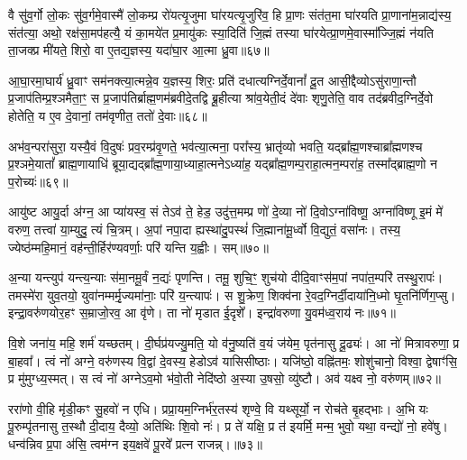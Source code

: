 वै सु॑व॒र्गो लो॒कः सु॑व॒र्गमे॒वास्मै॑ लो॒कम्प्र रो॑यत्यृ॒जुमा घा॑रयत्यृ॒जुरि॑व॒ हि प्रा॒णः संत॑त॒मा घा॑रयति प्रा॒णाना॑म॒न्नाद्य॑स्य॒ संत॑त्या॒ अथो॒ रक्ष॑सा॒मप॑हत्यै॒ यं का॒मये॑त प्र॒मायु॑कः स्या॒दिति॑ जि॒ह्मं तस्या घा॑रयेत्प्रा॒णमे॒वास्मा᳚ज्जि॒ह्मं न॑यति ता॒जक्प्र मी॑यते॒ शिरो॒ वा ए॒तद्य॒ज्ञस्य॒ यदा॑घा॒र आ॒त्मा ध्रु॒वा॥६७॥

आ॒घा॒रमा॒घार्य॑ ध्रु॒वाꣳ सम॑नक्त्या॒त्मन्ने॒व य॒ज्ञस्य॒ शिरः॒ प्रति॑ दधात्यग्निर्दे॒वानां᳚ दू॒त आसी॒द्दैव्यो\-ऽसु॑राणा॒न्तौ प्र॒जाप॑तिम्प्र॒श्ञमैता॒ꣳ॒ स प्र॒जाप॑तिर्ब्राह्म॒णम॑ब्रवीदे॒तद्वि ब्रू॒हीत्या श्रा॑व॒येती॒दं दे॑वाः शृणु॒तेति॒ वाव तद॑ब्रवीद॒ग्निर्दे॒वो होतेति॒ य ए॒व दे॒वानां॒ तम॑वृणीत॒ ततो॑ दे॒वाः॥६८॥

अभ॑व॒न्परा॑सुरा॒ यस्यै॒वं वि॒दुषः॑ प्रव॒रम्प्र॑वृ॒णते॒ भव॑त्या॒त्मना॒ परा᳚स्य॒ भ्रातृ॑व्यो भवति॒ यद्ब्रा᳚ह्म॒णश्चाब्रा᳚ह्मणश्च प्र॒श्ञमे॒यातां᳚ ब्राह्म॒णायाधि॑ ब्रूया॒द्यद्ब्रा᳚ह्म॒णाया॒ध्याहा॒त्मने\-ऽध्या॑ह॒ यद्ब्रा᳚ह्म॒णम्प॒राहा॒त्मन॒म्परा॑ह॒ तस्मा᳚द्ब्राह्म॒णो न प॒रोच्यः॑॥६९॥

{\anuvakamend[{वा आ॑र॒ण्याꣳश्चाव॑ रु॒न्धे\-ऽथो॑ प॒शुभिः॒ सो᳚\-ऽब्रवीद्दक्षिणा॒र्ध्य॑न्त्रय॑ इव ध्रु॒वा दे॒वाश्च॑त्वारि॒ꣳ॒शच्च॑॥11॥}]}

आयु॑ष्ट आयु॒र्दा अ॑ग्न॒ आ प्या॑यस्व॒ सं ते\-ऽव॑ ते॒ हेड॒ उदु॑त्त॒मम्प्र णो॑ दे॒व्या नो॑ दि॒वो\-ऽग्ना॑विष्णू॒ अग्ना॑विष्णू इ॒मं मे॑ वरुण॒ तत्त्वा॑ या॒म्युदु॒ त्यं चि॒त्रम्। अ॒पां नपा॒दा ह्यस्था॑दु॒पस्थं॑ जि॒ह्माना॑मू॒र्ध्वो वि॒द्युतं॒ वसा॑नः। तस्य॒ ज्येष्ठ॑म्महि॒मानं॒ वह॑न्ती॒र्\mbox{}हिर॑ण्यवर्णाः॒ परि॑ यन्ति य॒ह्वीः। सम्॥७०॥

अ॒न्या यन्त्युप॑ यन्त्य॒न्याः स॑मा॒नमू॒र्वं न॒द्यः॑ पृणन्ति। तमू॒ शुचि॒ꣳ॒ शुच॑यो दीदि॒वाꣳस॑म॒पां नपा॑त॒म्परि॑ तस्थु॒रापः॑। तमस्मे॑रा युव॒तयो॒ युवा॑नम्मर्मृ॒ज्यमा॑नाः॒ परि॑ य॒न्त्यापः॑। स शु॒क्रेण॒ शिक्व॑ना रे॒वद॒ग्निर्दी॒दाया॑नि॒ध्मो घृ॒तनि॑र्णिग॒प्सु। इन्द्रा॒वरु॑णयोर॒हꣳ स॒म्राजो॒रव॒ आ वृ॑णे। ता नो॑ मृडात ई॒दृशे᳚। इन्द्रा॑वरुणा यु॒वम॑ध्व॒राय॑ नः॥७१॥

वि॒शे जना॑य॒ महि॒ शर्म॑ यच्छतम्। दी॒र्घप्र॑यज्यु॒मति॒ यो व॑नु॒ष्यति॑ व॒यं ज॑येम॒ पृत॑नासु दू॒ढ्यः॑। आ नो॑ मित्रावरुणा॒ प्र बा॒हवा᳚। त्वं नो॑ अग्ने॒ वरु॑णस्य वि॒द्वां दे॒वस्य॒ हेडो\-ऽव॑ यासिसीष्ठाः। यजि॑ष्ठो॒ वह्नि॑तमः॒ शोशु॑चानो॒ विश्वा॒ द्वेषाꣳ॑सि॒ प्र मु॑मुग्ध्य॒स्मत्। स त्वं नो॑ अग्ने\-ऽव॒मो भ॑वो॒ती नेदि॑ष्ठो अ॒स्या उ॒षसो॒ व्यु॑ष्टौ। अव॑ यक्ष्व नो॒ वरु॑णम्॥७२॥

ररा॑णो वी॒हि मृ॑डी॒कꣳ सु॒हवो॑ न एधि। प्रप्रा॒यम॒ग्निर्भ॑र॒तस्य॑ शृण्वे॒ वि यथ्सूर्यो॒ न रोच॑ते बृ॒हद्भाः। अ॒भि यः पू॒रुम्पृ॑तनासु त॒स्थौ दी॒दाय॒ दैव्यो॒ अति॑थिः शि॒वो नः॑। प्र ते॑ यक्षि॒ प्र त॑ इयर्मि॒ मन्म॒ भुवो॒ यथा॒ वन्द्यो॑ नो॒ हवे॑षु। धन्व॑न्निव प्र॒पा अ॑सि॒ त्वम॑ग्न इय॒क्षवे॑ पू॒रवे᳚ प्रत्न राजन्न्।॥७३॥

